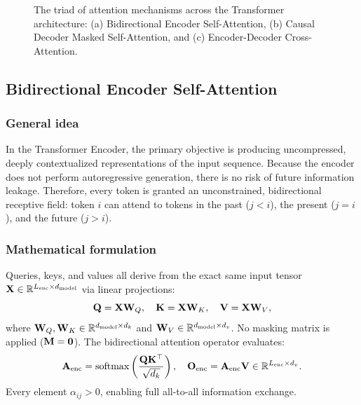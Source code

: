 \documentclass[../../main.tex]{subfiles}
\begin{document}
\begin{figure}[htbp]
{\begin{tikzpicture}
\end{tikzpicture}%
}
\caption{The triad of attention mechanisms across the Transformer architecture: (a) Bidirectional Encoder Self-Attention, (b) Causal Decoder Masked Self-Attention, and (c) Encoder-Decoder Cross-Attention.}
\label{fig:attention_triad_types_ch5}
\end{figure}

\subsection{Bidirectional Encoder Self-Attention}
\label{subsec:bidirectional_encoder_self_attn}

\subsubsection{General idea}
In the Transformer Encoder, the primary objective is producing uncompressed, deeply contextualized representations of the input sequence. Because the encoder does not perform autoregressive generation, there is no risk of future information leakage. Therefore, every token is granted an unconstrained, bidirectional receptive field: token $i$ can attend to tokens in the past ($j < i$), the present ($j = i$), and the future ($j > i$).

\subsubsection{Mathematical formulation}
Queries, keys, and values all derive from the exact same input tensor $\mathbf{X} \in \mathbb{R}^{L_{\text{enc}} \times d_{\text{model}}}$ via linear projections:
\begin{equation}
\label{eq:encoder_attn_projections_ch5}
\mathbf{Q} = \mathbf{X} \mathbf{W}_Q, \quad \mathbf{K} = \mathbf{X} \mathbf{W}_K, \quad \mathbf{V} = \mathbf{X} \mathbf{W}_V,
\end{equation}
where $\mathbf{W}_Q, \mathbf{W}_K \in \mathbb{R}^{d_{\text{model}} \times d_k}$ and $\mathbf{W}_V \in \mathbb{R}^{d_{\text{model}} \times d_v}$. No masking matrix is applied ($\mathbf{M} = \mathbf{0}$). The bidirectional attention operator evaluates:
\begin{equation}
\label{eq:bidirectional_attention_formula}
\mathbf{A}_{\text{enc}} = \operatorname{\mathrm{softmax}}\left( \frac{\mathbf{Q} \mathbf{K}^\top}{\sqrt{d_k}} \right), \quad \mathbf{O}_{\text{enc}} = \mathbf{A}_{\text{enc}} \mathbf{V} \in \mathbb{R}^{L_{\text{enc}} \times d_v}.
\end{equation}
Every element $\alpha_{ij} > 0$, enabling full all-to-all information exchange.
\end{document}

